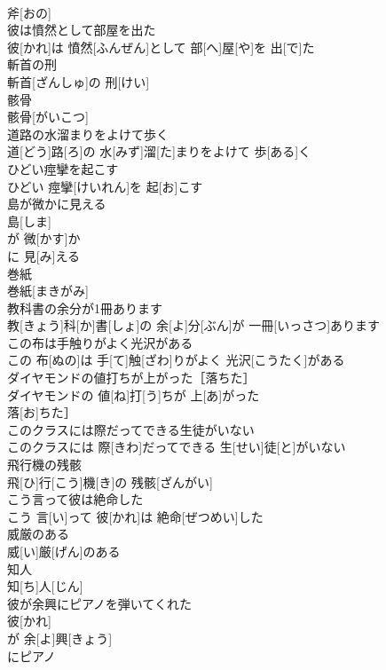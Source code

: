 \documentclass[8pt]{extreport}
\begin{document}
\begin{CJK}{UTF8}{min}
\\	斧[おの]
\\	彼は憤然として部屋を出た	
\\	彼[かれ]は 憤然[ふんぜん]として 部[へ]屋[や]を 出[で]た
\\	斬首の刑	
\\	斬首[ざんしゅ]の 刑[けい]
\\	骸骨	
\\	骸骨[がいこつ]
\\	道路の水溜まりをよけて歩く	
\\	道[どう]路[ろ]の 水[みず]溜[た]まりをよけて 歩[ある]く
\\	ひどい痙攣を起こす	
\\	ひどい 痙攣[けいれん]を 起[お]こす
\\	島が微かに見える	
\\	島[しま]
\\	が 微[かす]か 
\\	に 見[み]える 
\\	巻紙	
\\	巻紙[まきがみ]
\\	教科書の余分が1冊あります	
\\	教[きょう]科[か]書[しょ]の 余[よ]分[ぶん]が 一冊[いっさつ]あります
\\	この布は手触りがよく光沢がある	
\\	この 布[ぬの]は 手[て]触[ざわ]りがよく 光沢[こうたく]がある
\\	ダイヤモンドの値打ちが上がった［落ちた］	
\\	ダイヤモンドの 値[ね]打[う]ちが 上[あ]がった
\\	落[お]ちた］
\\	このクラスには際だってできる生徒がいない	
\\	このクラスには 際[きわ]だってできる 生[せい]徒[と]がいない
\\	飛行機の残骸	
\\	飛[ひ]行[こう]機[き]の 残骸[ざんがい]
\\	こう言って彼は絶命した	
\\	こう 言[い]って 彼[かれ]は 絶命[ぜつめい]した
\\	威厳のある	
\\	威[い]厳[げん]のある
\\	知人	
\\	知[ち]人[じん]
\\	彼が余興にピアノを弾いてくれた	
\\	彼[かれ]
\\	が 余[よ]興[きょう]
\\	にピアノ 

\end{CJK}
\end{document}
